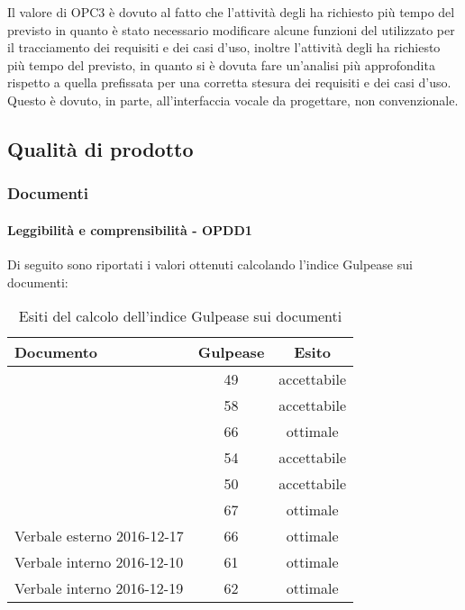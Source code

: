 \documentclass[PdQ.tex]{subfiles}
\begin{document}
			Il valore di OPC3 è dovuto al fatto che l’attività degli \AMMP{} ha richiesto più tempo del previsto in quanto è stato necessario modificare alcune funzioni del  utilizzato per il tracciamento dei requisiti e dei casi
d’uso, inoltre l’attività degli \ANP{} ha richiesto più tempo del previsto, in quanto si è dovuta fare un’analisi più approfondita rispetto a quella prefissata per una corretta stesura dei requisiti e dei casi d’uso. Questo è dovuto, in parte, all’interfaccia vocale da progettare, non convenzionale.
		
\newpage		
\subsection{Qualità di prodotto}
	\subsubsection{Documenti}
		\paragraph{Leggibilità e comprensibilità - OPDD1}
				Di seguito sono riportati i valori ottenuti calcolando l'indice Gulpease sui documenti:
				\begin{table}[h]
				\centering
				\begin{tabular}{l c c}
					\hline
					\rule[-0.3cm]{0cm}{0.8cm}
					\textbf{Documento} & \textbf{Gulpease} & \textbf{Esito} \\
					\hline
					\rule[0cm]{0cm}{0.4cm}
					\PPdocRR & 49 & accettabile \\
					\rule[0cm]{0cm}{0.4cm}
					\NPdocRR & 58 & accettabile \\ 
					\rule[0cm]{0cm}{0.4cm}
					\ARdocRR & 66 & ottimale \\ 
					\rule[0cm]{0cm}{0.4cm}
					\PQdocRR & 54 & accettabile \\ 
					\rule[0cm]{0cm}{0.4cm}
					\Gldoc & 50 & accettabile\\ 
					\rule[0cm]{0cm}{0.4cm}
					\SDKdoc & 67 & ottimale \\ 
					\rule[0cm]{0cm}{0.4cm}
					Verbale esterno 2016-12-17 & 66 & ottimale\\ 
					\rule[0cm]{0cm}{0.4cm}
					Verbale interno 2016-12-10 & 61 & ottimale\\ 
					\rule[0cm]{0cm}{0.4cm}
					Verbale interno 2016-12-19 & 62 & ottimale\\ 
					
					\hline
				\end{tabular}
				\caption{Esiti del calcolo dell'indice Gulpease sui documenti}
			\end{table}		
\end{document}
